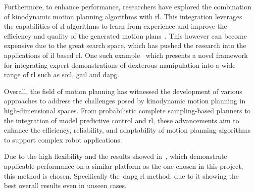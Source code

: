 Furthermore, to enhance performance, researchers have explored the combination of kinodynamic motion planning algorithms with \gls{rl}. This integration leverages the capabilities of \gls{rl} algorithms to learn from experience and improve the efficiency and quality of the generated motion plans~\cite{sampling-based-exploration-for-reinforcement-learning-of-dexterous-manipulation}. This however can become expensive due to the great search space, which has pushed the research into the applications of \gls{il} based \gls{rl}. One such example~\cite{dexmv:-imitation-learning-for-dexterous-manipulation-from-human-videos} which presents a novel framework for integrating expert demonstrations of dexterous manipulation into a wide range of \gls{rl} such as \gls{soil}, \gls{gail} and \gls{dapg}. \medskip

Overall, the field of motion planning has witnessed the development of various approaches to address the challenges posed by kinodynamic motion planning in high-dimensional spaces. From probabilistic complete sampling-based planners to the integration of model predictive control and \gls{rl}, these advancements aim to enhance the efficiency, reliability, and adaptability of motion planning algorithms to support complex robot applications. \medskip

Due to the high flexibility and the results showed in~\cite{dexmv:-imitation-learning-for-dexterous-manipulation-from-human-videos}, which demonstrate applicable performance on a similar platform as the one chosen in this project, this method is chosen. Specifically the~\gls{dapg} \gls{rl} method, due to it showing the best overall results even in unseen cases.
